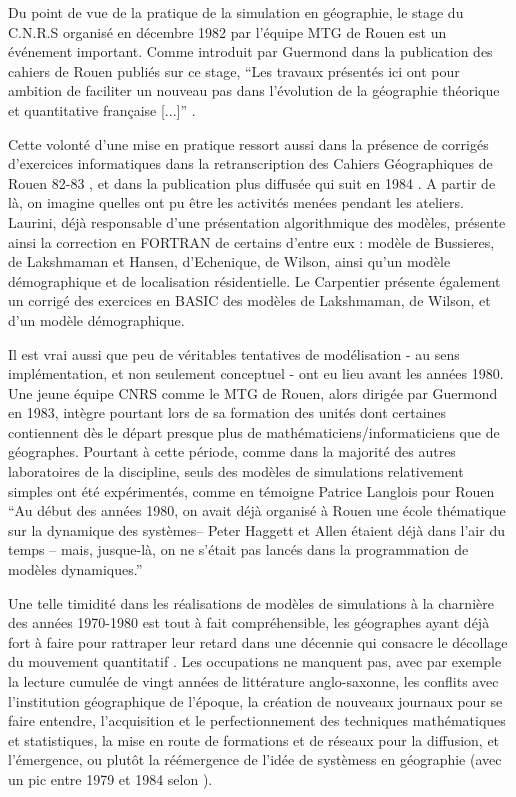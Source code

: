 Du point de vue de la pratique de la simulation en géographie, le stage du C.N.R.S organisé en décembre 1982 par l'équipe MTG de Rouen est un événement important. Comme introduit par Guermond dans la publication des cahiers de Rouen publiés sur ce stage, \enquote{Les travaux présentés ici ont pour ambition de faciliter un nouveau pas dans l'évolution de la géographie théorique et quantitative française [...]} \autocite{Guermond1983}.

Cette volonté d'une mise en pratique ressort aussi dans la présence de corrigés d'exercices informatiques dans la retranscription des Cahiers Géographiques de Rouen 82-83 \autocite{CGR1983}, et dans la publication plus diffusée qui suit en 1984 \autocite{Guermond1984}. A partir de là, on imagine quelles ont pu être les activités menées pendant les ateliers. Laurini, déjà responsable d'une présentation algorithmique des modèles, présente ainsi la correction en FORTRAN de certains d'entre eux : modèle de Bussieres, de Lakshmaman et Hansen, d'Echenique, de Wilson, ainsi qu'un modèle démographique et de localisation résidentielle. Le Carpentier présente également un corrigé des exercices en BASIC des modèles de Lakshmaman, de Wilson, et d'un modèle démographique.

Il est vrai aussi que peu de véritables tentatives de modélisation - au sens implémentation, et non seulement conceptuel - ont eu lieu avant les années 1980. Une jeune équipe CNRS comme le MTG de Rouen, alors dirigée par Guermond en 1983, intègre pourtant lors de sa formation des unités dont certaines contiennent dès le départ presque plus de mathématiciens/informaticiens que de géographes. Pourtant à cette période, comme dans la majorité des autres laboratoires de la discipline, seuls des modèles de simulations relativement simples ont été expérimentés, comme en témoigne Patrice Langlois pour Rouen \enquote{Au début des années 1980, on avait déjà organisé à Rouen une école thématique sur la dynamique des systèmes– Peter Haggett et Allen étaient déjà dans l’air du temps – mais, jusque-là, on ne s’était pas lancés dans la programmation de modèles dynamiques.} \autocite{Mathieu2014}

Une telle timidité dans les réalisations de modèles de simulations à la charnière des années 1970-1980 est tout à fait compréhensible, les géographes ayant déjà fort à faire pour rattraper leur retard dans une décennie qui consacre le décollage du mouvement quantitatif \autocites{Cuyala2014, Orain2009}. Les occupations ne manquent pas, avec par exemple la lecture cumulée de vingt années de littérature anglo-saxonne, les conflits avec l'institution géographique de l'époque, la création de nouveaux journaux pour se faire entendre, l'acquisition et le perfectionnement des techniques mathématiques et statistiques, la mise en route de formations et de réseaux pour la diffusion, et l'émergence, ou plutôt la réémergence de l'idée de systèmess en géographie (avec un pic entre 1979 et 1984 selon \textcite{Orain2001}).

